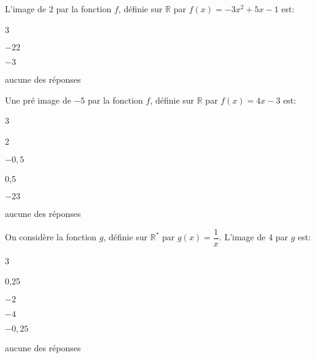 


\begin{QCM}
\begin{GroupeQCM}
\begin{exercice}L'image de 2 par la fonction $f$, définie sur $\mathbb{R}$ par $f(x)=-3x^2+5x-1$ est:
   \begin{ChoixQCM} {3}
   \item $-22$
   \item $-3$
   \item aucune des  réponses
    \end{ChoixQCM}
\end{exercice}
    \begin{corrige}
    \end{corrige}

\begin{exercice}Une pré image de $-5$  par la fonction $f$, définie sur $\mathbb{R}$ par $f(x)=4x -3$ est: 
    \begin{ChoixQCM} {3}
\item       2
\item $-0,5$
\item 0,5
\item $-23$
\item aucune des réponses
    \end{ChoixQCM}
\end{exercice}
    \begin{corrige}
    \end{corrige}

\begin{exercice}On considère la fonction $g$, définie sur $\mathbb{R^*}$ par $g(x)=\dfrac{1}{x}$. L'image de 4 par $g$ est: 
\begin{ChoixQCM} {3}
\item        0,25
\item $-2$
\item $-4$
\item $-0,25$
\item aucune des réponses
    \end{ChoixQCM}
\end{exercice}
    \begin{corrige}
    \end{corrige}

\end{GroupeQCM}
\end{QCM}

